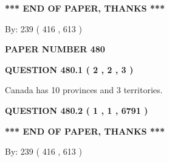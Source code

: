 \documentclass[12pt]{article}
\begin{document}
   
   
   
   
\vspace{1.0in} 
{\textbf{\large{ *** END OF PAPER, THANKS *** }}} 
   
   
\hspace{1.0in} By: 
 239 ( 416 ,  613 )
   
   
   
   
\newpage 
\setcounter{page}{ 
   480001 } 
   
   
   
   
 {\textbf{ \Large{ PAPER NUMBER  480  }}}
   
   
\vspace{0.2in}
   
   
   
   
   
   
 \vspace{0.2in}
 
 
 
 
   
   
  
\vspace{0.2in}
  
{\textbf{\Large{QUESTION
480.1 
 ( 2 , 2 , 3 )
}}}
  
  
 
 
\noindent{}
 
 
Canada has 10  provinces and 3 territories.
 
 
 
 
  
\vspace{0.2in}
  
{\textbf{\Large{QUESTION
480.2 
 ( 1 , 1 , 6791 )
}}}
  
  
   
   
 \vspace{0.2in}
 
   
   
   
   
\vspace{1.0in} 
{\textbf{\large{ *** END OF PAPER, THANKS *** }}} 
   
   
\hspace{1.0in} By: 
 239 ( 416 ,  613 )
   
   
   
   
\newpage 
\setcounter{page}{ 
   481001 } 
   
\end{document}
